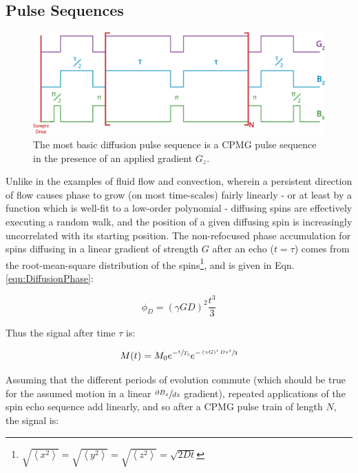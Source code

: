 \documentclass[PaulGanssle-Thesis.tex]{subfiles}
\begin{document}
\subsection{Pulse Sequences}
\label{Section:Relaxometry-Diffusion-PulseSequence}
\begin{figure}[ht!]
\centering
\includegraphics[width=0.9\tw]{figures/relaxometry/DiffusionPulseSequence.eps}
\caption{The most basic diffusion pulse sequence is a CPMG pulse sequence in the presence of an applied gradient $G_{z}$.}
\label{fig:DiffPulseSequence}
\end{figure}

Unlike in the examples of fluid flow and convection, wherein a persistent direction of flow causes phase to grow (on most time-scales) fairly linearly - or at least by a function which is well-fit to a low-order polynomial - diffusing spins are effectively executing a random walk, and the position of a given diffusing spin is increasingly uncorrelated with its starting position. The non-refocused phase accumulation for spins diffusing in a linear gradient of strength $G$ after an echo ($t = \tau$) comes from the root-mean-square distribution of the spins\footnote{$\sqrt{\left\langle x^2\right\rangle} = \sqrt{\left\langle y^2\right\rangle} = \sqrt{\left\langle z^2\right\rangle} = \sqrt{2Dt}$}, and is given in Eqn. \ref{eqn:DiffusionPhase}:

\begin{equation}
\label{eqn:DiffusionPhase}
\phi_D = (\gamma G D)^2\frac{t^3}{3}
\end{equation}

Thus the signal after time $\tau$ is:

\begin{equation}
\label{eqn:Diffusionsignal}
M(t) = M_{0}e^{-\sfrac{t}{T_{2}}}e^{-\sfrac{\left(\gamma G\right)^2D\tau^3}{3}}
\end{equation}

Assuming that the different periods of evolution commute (which should be true for the assumed motion in a linear $\sfrac{\partial B_{z}}{d z}$ gradient), repeated applications of the spin echo sequence add linearly, and so after a CPMG pulse train of length $N$, the signal is:\cite{f-exp-pulse-nmr}
\end{document}
